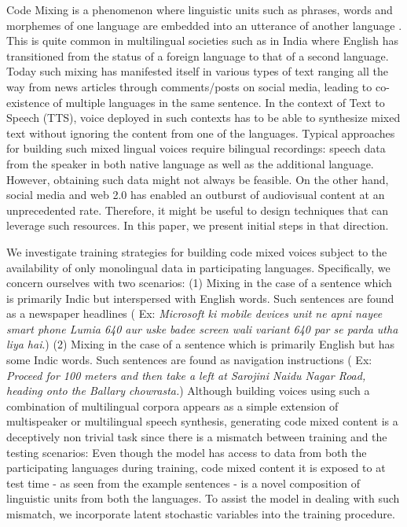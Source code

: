 Code Mixing is a phenomenon where linguistic units such as phrases, words and morphemes of one language are embedded into an utterance of another language \cite{muysken2000bilingual,gella2014ye}. This is quite common in multilingual societies such as in India where English has transitioned from the status of a foreign language to that of a second language. Today such mixing has manifested itself in various types of text ranging all the way from news articles through comments/posts on social media, leading to co-existence of multiple languages in the same sentence. In the context of Text to Speech (TTS), voice deployed in such contexts has to be able to synthesize mixed text without ignoring the content from one of the languages. Typical approaches for building such mixed lingual voices require bilingual recordings\cite{traber1999multilingual,rallabandi_mixedlingual_IS2017,chandu2017speech}: speech data from the speaker in both native language as well as the additional language. However, obtaining such data might not always be feasible. On the other hand, social media and web 2.0 has enabled an outburst of audiovisual content at an unprecedented rate. Therefore, it might be useful to design techniques that can leverage such resources. In this paper, we present initial steps in that direction.


We investigate training strategies for building code mixed voices subject to the availability of only monolingual data in participating languages. Specifically, we concern ourselves with two scenarios: (1) Mixing in the case of a sentence which is primarily Indic but interspersed with English words. Such sentences are found as a newspaper headlines ( Ex: \textit{Microsoft ki mobile devices unit ne apni nayee smart phone Lumia 640 aur uske badee screen wali variant 640 par se parda utha liya hai}.)  (2) Mixing in the case of a sentence which is primarily English but has some Indic words. Such sentences are found as navigation instructions ( Ex: \textit{Proceed for 100 meters and then take a left at Sarojini Naidu Nagar Road, heading onto the Ballary chowrasta.})  Although building voices using such a combination of multilingual corpora appears as a simple extension of multispeaker or multilingual speech synthesis, generating code mixed content is a deceptively non trivial task since there is a mismatch between training and the testing scenarios: Even though the model has access to data from both the participating languages during training, code mixed content it is exposed to at test time - as seen from the example sentences - is a novel composition of linguistic units from both the languages. To assist the model in dealing with such mismatch, we incorporate latent stochastic variables into the training procedure.

